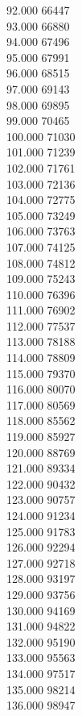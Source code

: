 { 92.000	66447 \\
 93.000	66880 \\
 94.000	67496 \\
 95.000	67991 \\
 96.000	68515 \\
 97.000	69143 \\
 98.000	69895 \\
 99.000	70465 \\
 100.000	71030 \\
 101.000	71239 \\
 102.000	71761 \\
 103.000	72136 \\
 104.000	72775 \\
 105.000	73249 \\
 106.000	73763 \\
 107.000	74125 \\
 108.000	74812 \\
 109.000	75243 \\
 110.000	76396 \\
 111.000	76902 \\
 112.000	77537 \\
 113.000	78188 \\
 114.000	78809 \\
 115.000	79370 \\
 116.000	80070 \\
 117.000	80569 \\
 118.000	85562 \\
 119.000	85927 \\
 120.000	88769 \\
 121.000	89334 \\
 122.000	90432 \\
 123.000	90757 \\
 124.000	91234 \\
 125.000	91783 \\
 126.000	92294 \\
 127.000	92718 \\
 128.000	93197 \\
 129.000	93756 \\
 130.000	94169 \\
 131.000	94822 \\
 132.000	95190 \\
 133.000	95563 \\
 134.000	97517 \\
 135.000	98214 \\
 136.000	98947 \\
}
